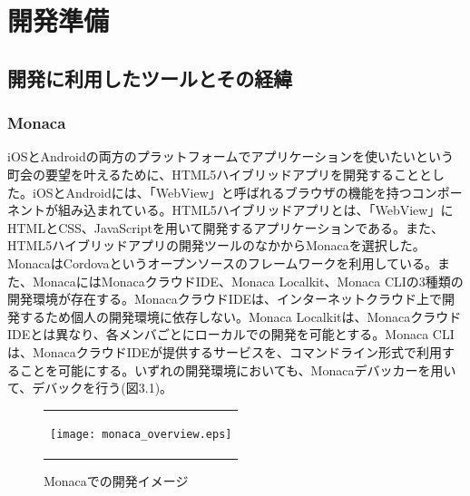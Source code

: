 \chapter{開発準備}

\section{開発に利用したツールとその経緯}%
\subsection{Monaca}%
iOSとAndroidの両方のプラットフォームでアプリケーションを使いたいという町会の要望を叶えるために、HTML5ハイブリッドアプリを開発することとした。iOSとAndroidには、「WebView」と呼ばれるブラウザの機能を持つコンポーネントが組み込まれている。HTML5ハイブリッドアプリとは、「WebView」にHTMLとCSS、JavaScriptを用いて開発するアプリケーションである。また、HTML5ハイブリッドアプリの開発ツールのなかからMonacaを選択した。MonacaはCordovaというオープンソースのフレームワークを利用している。また、MonacaにはMonacaクラウドIDE、Monaca Localkit、Monaca CLIの3種類の開発環境が存在する。MonacaクラウドIDEは、インターネットクラウド上で開発するため個人の開発環境に依存しない。Monaca Localkitは、MonacaクラウドIDEとは異なり、各メンバごとにローカルでの開発を可能とする。Monaca CLIは、MonacaクラウドIDEが提供するサービスを、コマンドライン形式で利用することを可能にする。いずれの開発環境においても、Monacaデバッカーを用いて、デバックを行う(図3.1)。

\begin{figure}[h]
  \begin{center}
    \begin{tabular}{c}

      \begin{minipage}{0.7\hsize}
        \begin{center}
\texttt{[image: monaca\_overview.eps]}
          \hspace{1cm} %
        \end{center}
      \end{minipage}

    \end{tabular}
    \caption{Monacaでの開発イメージ}
    \label{fig:lena}
  \end{center}
\end{figure}

